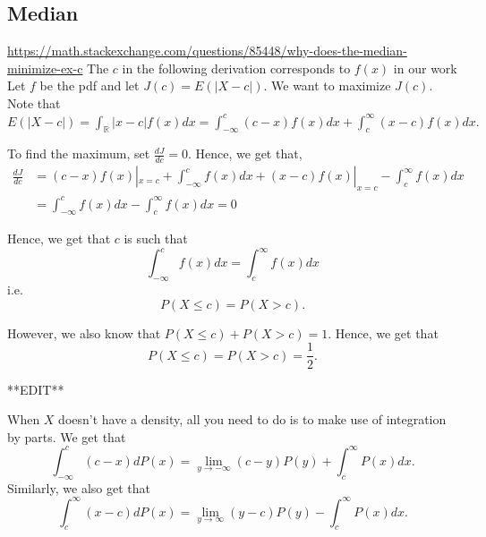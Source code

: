 \documentclass{article}
\begin{document}
\subsection{Median}
\url{https://math.stackexchange.com/questions/85448/why-does-the-median-minimize-ex-c} The $c$ in the following derivation corresponds to $f(x)$ in our work\\


Let $f$ be the pdf and let $J(c) = E(|X-c|)$. We want to maximize $J(c)$. Note that $E(|X-c|) = \int_{\mathbb{R}} |x-c| f(x) dx = \int_{-\infty}^{c} (c-x) f(x) dx  + \int_c^{\infty} (x-c) f(x) dx.$

To find the maximum, set $\frac{dJ}{dc} = 0$. Hence, we get that,
\begin{align}
\frac{dJ}{dc} & = (c-x)f(x) | _{x=c} + \int_{-\infty}^{c} f(x) dx + (x-c)f(x) | _{x=c} - \int_c^{\infty} f(x) dx\\
& = \int_{-\infty}^{c} f(x) dx - \int_c^{\infty} f(x) dx = 0
\end{align}


Hence, we get that $c$ is such that $$\int_{-\infty}^{c} f(x) dx = \int_c^{\infty} f(x) dx$$ i.e. $$P(X \leq c) = P(X > c).$$

However, we also know that $P(X \leq c) + P(X > c) = 1$. Hence, we get that $$P(X \leq c) = P(X > c) = \frac12.$$

**EDIT**

When $X$ doesn't have a density, all you need to do is to make use of integration by parts. We get that $$\displaystyle \int_{-\infty}^{c} (c-x) dP(x) = \lim_{y \rightarrow -\infty} (c-y) P(y) + \displaystyle \int_{c}^{\infty} P(x) dx.$$ Similarly, we also get that $$\displaystyle \int_{c}^{\infty} (x-c) dP(x) = \lim_{y \rightarrow \infty} (y-c) P(y) - \displaystyle \int_{c}^{\infty} P(x) dx.$$
\end{document}
